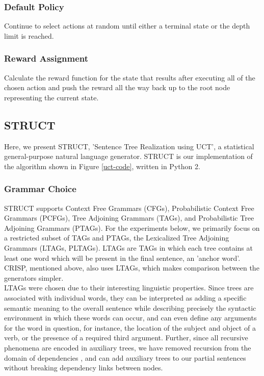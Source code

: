 \subsubsection{Default Policy}
Continue to select actions at random until either a terminal state or the depth limit is reached.

\subsubsection{Reward Assignment}
Calculate the reward function for the state that results after executing all of the chosen action and push the reward all the way back up to the root node representing the current state.

\subsection{STRUCT}

Here, we present STRUCT, 'Sentence Tree Realization using UCT', a statistical general-purpose natural language generator.  STRUCT is our implementation of the algorithm shown in Figure \ref{uct-code}, written in Python 2.

\subsubsection{Grammar Choice}

STRUCT supports Context Free Grammars (CFGs), Probabilistic Context Free Grammars (PCFGs), Tree Adjoining Grammars (TAGs), and Probabilistic Tree Adjoining Grammars (PTAGs).  For the experiments below, we primarily focus on a restricted subset of TAGs and PTAGs, the Lexicalized Tree Adjoining Grammars (LTAGs, PLTAGs).  LTAGs are TAGs in which each tree contains at least one word which will be present in the final sentence, an 'anchor word'.  CRISP, mentioned above, also uses LTAGs, which makes comparison between the generators simpler.\\

 LTAGs were chosen due to their interesting linguistic properties.  Since trees are associated with individual words, they can be interpreted as adding a specific semantic meaning to the overall sentence while describing precisely the syntactic environment in which these words can occur, and can even define any arguments for the word in question, for instance, the location of the subject and object of a verb, or the presence of a required third argument.  Further, since all recursive phenomena are encoded in auxiliary trees, we have removed recursion from the domain of dependencies \cite{bauer2009statistical}, and can add auxiliary trees to our partial sentences without breaking dependency links between nodes.

